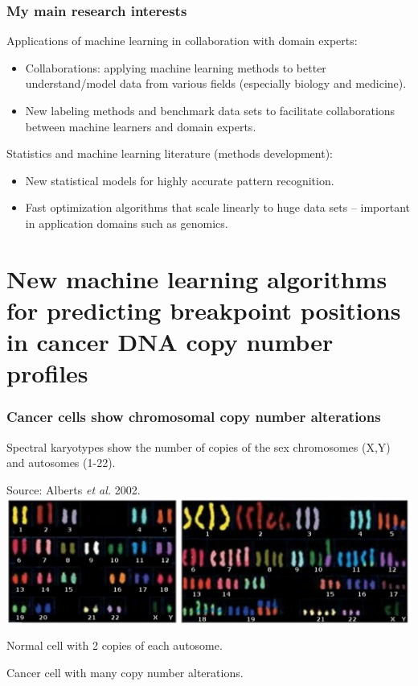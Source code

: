 \documentclass{beamer}
\begin{document}
\begin{frame}
  \frametitle{My main research interests}
  Applications of machine learning in collaboration with domain experts:
  \begin{itemize}
  \item Collaborations: applying machine learning methods to better
    understand/model data from various fields (especially biology and
    medicine).
  \item New labeling methods and benchmark data sets to facilitate
    collaborations between machine learners and domain experts.
  \end{itemize}
  Statistics and machine learning literature (methods development):
  \begin{itemize}
  \item New statistical models for highly accurate pattern
    recognition.
  \item Fast optimization algorithms that scale linearly to huge data
    sets -- important in application domains such as genomics.
  \end{itemize}
\end{frame}

\section{New machine learning algorithms for predicting breakpoint positions in cancer DNA copy number profiles}

\begin{frame}
  \frametitle{Cancer cells show chromosomal copy number alterations}
  Spectral karyotypes show the number of copies of the sex chromosomes
  (X,Y) and autosomes (1-22). 

  Source: Alberts \emph{et al.} 2002.
\vskip 0.1in
  \includegraphics[width=\textwidth]{Karyo-both}
\vskip 0.1in
  \begin{minipage}{0.4\linewidth}
    Normal cell with 2 copies of each autosome.
  \end{minipage}
\linewidth
  \begin{minipage}{0.4\linewidth}
Cancer cell with many copy number alterations.
  \end{minipage}
\end{frame}
\end{document}
